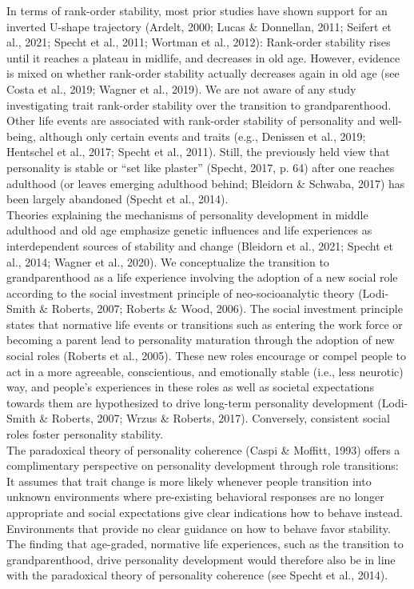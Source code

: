 \documentclass[
  english,
  man,floatsintext]{apa7}
\begin{document}
In terms of rank-order stability, most prior studies have shown support for an inverted U-shape trajectory (Ardelt, 2000; Lucas \& Donnellan, 2011; Seifert et al., 2021; Specht et al., 2011; Wortman et al., 2012): Rank-order stability rises until it reaches a plateau in midlife, and decreases in old age. However, evidence is mixed on whether rank-order stability actually decreases again in old age (see Costa et al., 2019; Wagner et al., 2019). We are not aware of any study investigating trait rank-order stability over the transition to grandparenthood. Other life events are associated with rank-order stability of personality and well-being, although only certain events and traits (e.g., Denissen et al., 2019; Hentschel et al., 2017; Specht et al., 2011). Still, the previously held view that personality is stable or \enquote{set like plaster} (Specht, 2017, p. 64) after one reaches adulthood (or leaves emerging adulthood behind; Bleidorn \& Schwaba, 2017) has been largely abandoned (Specht et al., 2014).\\
Theories explaining the mechanisms of personality development in middle adulthood and old age emphasize genetic influences and life experiences as interdependent sources of stability and change (Bleidorn et al., 2021; Specht et al., 2014; Wagner et al., 2020). We conceptualize the transition to grandparenthood as a life experience involving the adoption of a new social role according to the social investment principle of neo-socioanalytic theory (Lodi-Smith \& Roberts, 2007; Roberts \& Wood, 2006). The social investment principle states that normative life events or transitions such as entering the work force or becoming a parent lead to personality maturation through the adoption of new social roles (Roberts et al., 2005). These new roles encourage or compel people to act in a more agreeable, conscientious, and emotionally stable (i.e., less neurotic) way, and people's experiences in these roles as well as societal expectations towards them are hypothesized to drive long-term personality development (Lodi-Smith \& Roberts, 2007; Wrzus \& Roberts, 2017). Conversely, consistent social roles foster personality stability.\\
The paradoxical theory of personality coherence (Caspi \& Moffitt, 1993) offers a complimentary perspective on personality development through role transitions: It assumes that trait change is more likely whenever people transition into unknown environments where pre-existing behavioral responses are no longer appropriate and social expectations give clear indications how to behave instead. Environments that provide no clear guidance on how to behave favor stability. The finding that age-graded, normative life experiences, such as the transition to grandparenthood, drive personality development would therefore also be in line with the paradoxical theory of personality coherence (see Specht et al., 2014).\\
\end{document}
